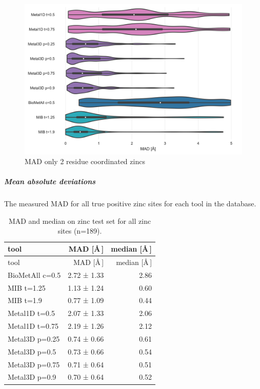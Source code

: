 \documentclass[  ASAPversion,
  ,
  9pt]{elife}
\newenvironment{fignos:tagged-figure}[1][]{
  \let\oldthefigure\thefigure
  \let\oldtheHfigure\theHfigure
  \renewcommand{\thefigure}{#1}
  \renewcommand{\theHfigure}{#1}
}{
  \let\thefigure\oldthefigure
  \let\theHfigure\oldtheHfigure
  \addtocounter{figure}{-1}
}
\newenvironment{tablenos:tagged-table}[1][]{
  \let\oldthetable\thetable
  \let\oldtheHtable\theHtable
  \renewcommand{\thetable}{#1}
  \renewcommand{\theHtable}{#1}
}{
  \let\thetable\oldthetable
  \let\theHtable\oldtheHtable
  \addtocounter{table}{-1}
}
\begin{document}
\begin{fignos:tagged-figure}[S7]

\begin{figure}
\hypertarget{fig:madonlyGoodZnmetal3d}{%
\centering
\includegraphics{images/mad_violin_0.5_2+.jpg}
\caption{MAD only 2 residue coordinated zincs}\label{fig:madonlyGoodZnmetal3d}
}
\end{figure}

\end{fignos:tagged-figure}

\hypertarget{mean-absolute-deviations}{%
\subparagraph{Mean absolute deviations}\label{mean-absolute-deviations}}

The measured MAD for all true positive zinc sites for each tool in the database.

\begin{tablenos:tagged-table}[S3]

\begin{longtable}[]{@{}lrr@{}}
\caption{MAD and median on zinc test set for all zinc sites (n=189). \label{tbl:compmadmediantest}}\tabularnewline
\toprule
tool & MAD {[}\AA\,{]} & median {[}\AA\,{]}\tabularnewline
\midrule
\endfirsthead
\toprule
tool & MAD {[}\AA\,{]} & median {[}\AA\,{]}\tabularnewline
\midrule
\endhead
BioMetAll c=0.5 & 2.72 ± 1.33 & 2.86\tabularnewline
MIB t=1.25 & 1.13 ± 1.24 & 0.60\tabularnewline
MIB t=1.9 & 0.77 ± 1.09 & 0.44\tabularnewline
Metal1D t=0.5 & 2.07 ± 1.33 & 2.06\tabularnewline
Metal1D t=0.75 & 2.19 ± 1.26 & 2.12\tabularnewline
Metal3D p=0.25 & 0.74 ± 0.66 & 0.61\tabularnewline
Metal3D p=0.5 & 0.73 ± 0.66 & 0.54\tabularnewline
Metal3D p=0.75 & 0.71 ± 0.64 & 0.51\tabularnewline
Metal3D p=0.9 & 0.70 ± 0.64 & 0.52\tabularnewline
\bottomrule
\end{longtable}

\end{tablenos:tagged-table}
\end{document}
